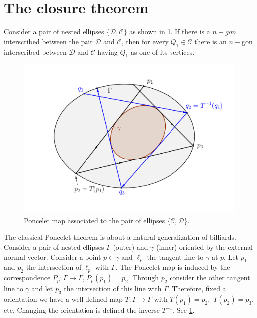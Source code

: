 \section{The closure theorem}

\begin{theorem}  Consider a pair of nested ellipses $\{\mathcal{D},\mathcal{C}\}$ as shown in \cref{fig:poncelet}. If there is a $n-gon$ interscribed between the pair $\mathcal{D}$ and $\mathcal{C}$, then for every $Q_1\in \mathcal{C}$ there is an $n-$gon interscribed between $\mathcal{D}$ and $\mathcal{C}$ having $Q_1$ as one of its vertices.

\label{th:poncelet}
\end{theorem}


\begin{figure}
\begin{center}
\includegraphics[scale=0.6]{chap_02/pics/pics_chap2-030-poncelet-map.pdf}
\end{center}
\caption{Poncelet map associated to the pair of ellipses $\{\mathcal{C},\mathcal{D}\}.$}
\label{fig:poncelet}
\end{figure}

The classical Poncelet theorem is about a natural generalization of billiards. Consider a pair of nested ellipses $\Gamma$ (outer) and $\gamma$ (inner) oriented by the external normal vector.
Consider a point $p\in \gamma$ and  $\ell_p$ the   tangent line  to $\gamma$ at $p$. Let $p_1$ and $p_2$ the intersection of  $\ell_p$ with $\Gamma.$ The Poncelet map is induced by the correspondence
$P_p:\Gamma\to\Gamma$, $P_p(p_1)=p_2$. Through $p_2$ consider the other tangent line to $\gamma$ and let $p_3$ the intersection of this line with $\Gamma$. Therefore, fixed a orientation we have a well defined map $T:\Gamma\to \Gamma$ with $T(p_1)=p_2,$ $T(p_2)=p_3$, etc. 
Changing the orientation is defined the inverse $T^{-1}.$ See  \cref{fig:poncelet}.

